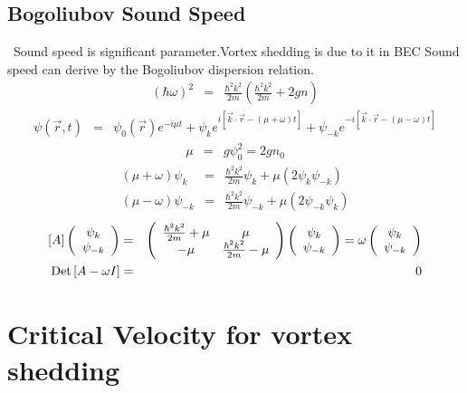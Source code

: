 \documentclass[12pt,a4paper]{report}
\begin{document}
\section{Bogoliubov Sound Speed}
\ Sound speed is significant parameter.Vortex shedding is due to it in BEC
Sound speed can derive by the Bogoliubov dispersion relation.
\begin{eqnarray}
(\hbar \omega)^2 & = & \frac{\hbar^2 k^2}{2m} \left( \frac{\hbar^2 k^2}{2m} + 2 g n \right)
\end{eqnarray}
\begin{eqnarray}
\psi(\vec{r}, t) & = & \psi_0 (\vec{r}) e^{-i \mu t}
+ \psi_k e^{i \left[ \vec{k} \cdot \vec{r} - (\mu + \omega) t \right]}
+ \psi_{-k} e^{-i \left[ \vec{k} \cdot \vec{r} - (\mu - \omega) t \right]}
\end{eqnarray}
\begin{eqnarray}
\mu & = & g \psi^2_0 = 2gn_0
\end{eqnarray}
\begin{eqnarray}
(\mu + \omega) \psi_{k} & = & \frac{\hbar^2 k^2}{2m} \psi_{k} + \mu(2 \psi_{k} \psi_{-k} )
\\
(\mu - \omega) \psi_{-k} & = & \frac{\hbar^2 k^2}{2m} \psi_{-k} + \mu(2 \psi_{-k} \psi_k )
\end{eqnarray}
\begin{eqnarray}
\left[ A \right]
\left( \begin{array}{c} \psi_k \\ \psi_{-k} \end{array} \right) 
& = &
\left( \begin{array}{c c}
\frac{\hbar^2 k^2}{2m} + \mu & \mu
\\
-\mu & \frac{\hbar^2 k^2}{2m} - \mu
\end{array} \right)
\left( \begin{array}{c} \psi_k \\ \psi_{-k} \end{array} \right) 
=
\omega
\left( \begin{array}{c} \psi_k \\ \psi_{-k} \end{array} \right) 
\\
{\rm Det} \left[A - \omega I \right] & = & 0
\end{eqnarray}
\fi %

\chapter{Critical Velocity for vortex shedding}
\end{document}
